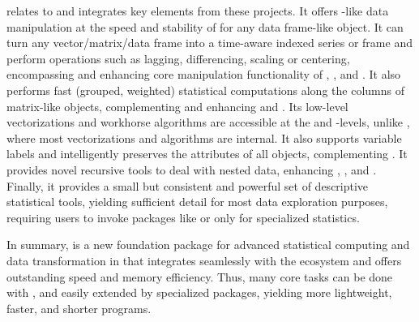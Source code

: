 \documentclass[nojss]{jss} %
\begin{document}
 relates to and integrates key elements from these projects. It offers -like data manipulation at the speed and stability of  for any data frame-like object. It can turn any vector/matrix/data frame into a time-aware indexed series or frame and perform operations such as lagging, differencing, scaling or centering, encompassing and enhancing core manipulation functionality of , , and . It also performs fast (grouped, weighted) statistical computations along the columns of matrix-like objects, complementing and enhancing  and . Its low-level vectorizations and workhorse algorithms are accessible at the  and -levels, unlike , where most vectorizations and algorithms are internal. It also supports variable labels and intelligently preserves the attributes of all objects, complementing . It provides novel recursive tools to deal with nested data, enhancing , , and . Finally, it provides a small but consistent and powerful set of descriptive statistical tools, yielding sufficient detail for most data exploration purposes, requiring users to invoke packages like  or  only for specialized statistics. \newline

In summary,  is a new foundation package for advanced statistical computing and data transformation in  that integrates seamlessly with the ecosystem and offers outstanding speed and memory efficiency. Thus, many core tasks can be done with , and easily extended by specialized packages, yielding more lightweight, faster, and shorter  programs. \newline
\end{document}
